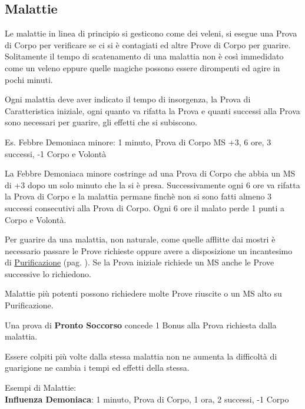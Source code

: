 \documentclass[12pt,a4paper,twoside,openany]{book}
\begin{document}
\medskip

\begin{multicols}{2}


\subsection{Malattie}\hypertarget{malattie}{}\label{malattie}

Le malattie in linea di principio si gesticono come dei veleni, si esegue una Prova di Corpo per verificare se ci si è contagiati ed altre Prove di Corpo per guarire. 
Solitamente il tempo di scatenamento di una malattia non è così immedidato come un veleno eppure quelle magiche possono essere dirompenti ed agire in pochi minuti.

Ogni malattia  deve aver indicato il tempo di insorgenza, la Prova di Caratteristica iniziale, ogni quanto va rifatta la Prova e quanti successi alla Prova sono necessari per guarire, gli effetti che si subiscono.

Es. Febbre Demoniaca minore: 1 minuto, Prova di Corpo MS +3, 6 ore, 3 successi, -1 Corpo e Volontà

La Febbre Demoniaca minore costringe ad una Prova di Corpo che abbia un MS di +3 dopo un solo minuto che la si è presa. Successivamente ogni 6 ore va rifatta la Prova di Corpo e la malattia permane finchè non si sono fatti almeno 3 successi consecutivi alla Prova di Corpo. Ogni 6 ore il malato perde 1 punti a Corpo e Volontà.

Per guarire da una malattia, non naturale, come quelle afflitte dai mostri è necessario passare le Prove richieste oppure avere a disposizione un incantesimo di \hyperlink{rimuovimalattie}{Purificazione} (pag. \pageref{Purificazione}). Se la Prova iniziale richiede un MS anche le Prove successive lo richiedono.

Malattie più potenti possono richiedere molte Prove riuscite o un MS alto su Purificazione.

Una prova di \textbf{Pronto Soccorso} concede 1 Bonus alla Prova richiesta dalla malattia.

Essere colpiti più volte dalla stessa malattia non ne aumenta la difficoltà di guarigione ne cambia i tempi ed effetti della stessa.

Esempi di Malattie:\\

\textbf{Influenza Demoniaca}:  1 minuto, Prova di Corpo, 1 ora, 2 successi, -1 Corpo


\end{multicols}
\end{document}
